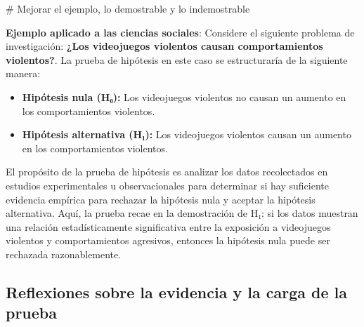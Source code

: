 \documentclass[
  letterpaper,
  DIV=11,
  numbers=noendperiod]{scrreprt}
\newenvironment{Shaded}{\begin{snugshade}}{\end{snugshade}}
\newcommand{\CommentTok}[1]{\textcolor[rgb]{0.37,0.37,0.37}{#1}}
\begin{document}
\begin{tcolorbox}[enhanced jigsaw, toprule=.15mm, opacitybacktitle=0.6, toptitle=1mm, arc=.35mm, left=2mm, title=\textcolor{quarto-callout-tip-color}{\faLightbulb}\hspace{0.5em}{Tip}, titlerule=0mm, leftrule=.75mm, rightrule=.15mm, coltitle=black, bottomtitle=1mm, bottomrule=.15mm, colframe=quarto-callout-tip-color-frame, opacityback=0, colback=white, breakable, colbacktitle=quarto-callout-tip-color!10!white]

\begin{Shaded}
\begin{Highlighting}[]
\CommentTok{\# Mejorar el ejemplo, lo demostrable y lo indemostrable}
\end{Highlighting}
\end{Shaded}

\textbf{Ejemplo aplicado a las ciencias sociales}: Considere el
siguiente problema de investigación: \textbf{¿Los videojuegos violentos
causan comportamientos violentos?}. La prueba de hipótesis en este caso
se estructuraría de la siguiente manera:

\begin{itemize}
\item
  \textbf{Hipótesis nula (H₀):} Los videojuegos violentos no causan un
  aumento en los comportamientos violentos.
\item
  \textbf{Hipótesis alternativa (H₁):} Los videojuegos violentos causan
  un aumento en los comportamientos violentos.
\end{itemize}

\end{tcolorbox}

El propósito de la prueba de hipótesis es analizar los datos
recolectados en estudios experimentales u observacionales para
determinar si hay suficiente evidencia empírica para rechazar la
hipótesis nula y aceptar la hipótesis alternativa. Aquí, la prueba recae
en la demostración de H₁: si los datos muestran una relación
estadísticamente significativa entre la exposición a videojuegos
violentos y comportamientos agresivos, entonces la hipótesis nula puede
ser rechazada razonablemente.

\subsection{Reflexiones sobre la evidencia y la carga de la
prueba}\label{reflexiones-sobre-la-evidencia-y-la-carga-de-la-prueba}
\end{document}
